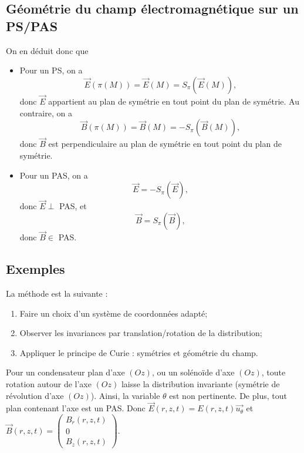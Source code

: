     \subsection[Géométrie du champ sur un PS/PAS]{Géométrie du champ électromagnétique sur un PS/PAS}

        On en déduit donc que 
        \begin{itemize}
            \item Pour un PS, on a 
            \begin{equation*}
                \vec{E}(\pi(M))=\vec{E}(M)=S_{\pi}(\vec{E}(M)),
            \end{equation*}
            donc $\vec{E}$ appartient au plan de symétrie en tout point du plan de symétrie. Au contraire, on a 
            \begin{equation*}
                \vec{B}(\pi(M))=\vec{B}(M)=-S_{\pi}(\vec{B}(M)),
            \end{equation*}
            donc $\vec{B}$ est perpendiculaire au plan de symétrie en tout point du plan de symétrie.

            \item Pour un PAS, on a 
            \begin{equation*}
                \vec{E}=-S_{\pi}(\vec{E}),
            \end{equation*}
            donc $\vec{E}\perp$ PAS, et
            \begin{equation*}
                \vec{B}=S_{\pi}(\vec{B}),
            \end{equation*}
            donc $\vec{B}\in$ PAS.
        \end{itemize}

    \subsection{Exemples}

        La méthode est la suivante :
        \begin{enumerate}
            \item Faire un choix d'un système de coordonnées adapté;
            \item Observer les invariances par translation/rotation de la distribution;
            \item Appliquer le principe de Curie : symétries et géométrie du champ.
        \end{enumerate}

        Pour un condensateur plan d'axe $(Oz)$, ou un solénoïde d'axe $(Oz)$, toute rotation autour de l'axe $(Oz)$ laisse la distribution invariante (symétrie de révolution d'axe $(Oz)$). Ainsi, la variable $\theta$ est non pertinente. De plus, tout plan contenant l'axe est un PAS. Donc $\vec{E}(r,z,t)=E(r,z,t)\vec{u_{\theta}}$ et $\vec{B}(r,z,t)=\begin{pmatrix}
                B_r(r,z,t)\\0\\B_{z}(r,z,t)
            \end{pmatrix}$.